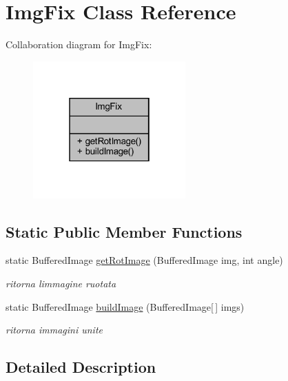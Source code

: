 \hypertarget{classhelpz_1_1_img_fix}{}\section{Img\+Fix Class Reference}
\label{classhelpz_1_1_img_fix}


Collaboration diagram for Img\+Fix\+:\nopagebreak
\begin{figure}[H]
\begin{center}
\leavevmode
\includegraphics[width=166pt]{classhelpz_1_1_img_fix__coll__graph}
\end{center}
\end{figure}
\subsection*{Static Public Member Functions}
\begin{DoxyCompactItemize}
\item 
static Buffered\+Image \hyperlink{classhelpz_1_1_img_fix_aa29daa5edc91f3950ba54a6b2018a48b}{get\+Rot\+Image} (Buffered\+Image img, int angle)
\begin{DoxyCompactList}\small\item\em ritorna l\textquotesingle{}immagine ruotata \end{DoxyCompactList}\item 
static Buffered\+Image \hyperlink{classhelpz_1_1_img_fix_a1dabaa5ea503e0530b951a21811df80e}{build\+Image} (Buffered\+Image\mbox{[}$\,$\mbox{]} imgs)
\begin{DoxyCompactList}\small\item\em ritorna immagini unite \end{DoxyCompactList}\end{DoxyCompactItemize}


\subsection{Detailed Description}


